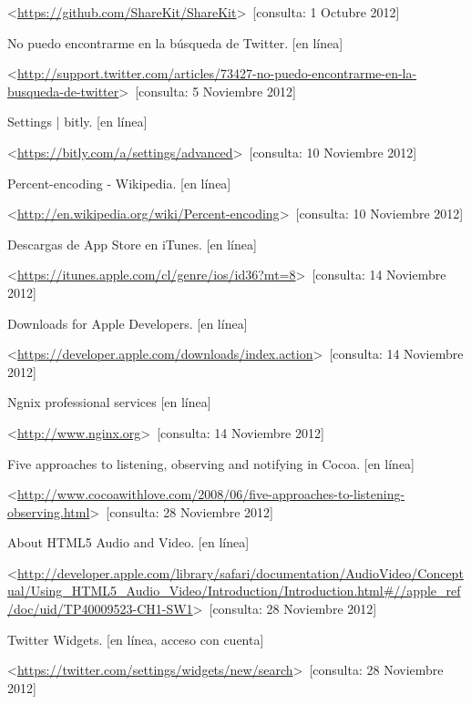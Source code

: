 \begin{thebibliography}{99}
\begin{sloppypar}
\textless \url{https://github.com/ShareKit/ShareKit}\textgreater \ [consulta: 1 Octubre 2012] 

%
No puedo encontrarme en la búsqueda de Twitter. [en línea]

\textless \url{http://support.twitter.com/articles/73427-no-puedo-encontrarme-en-la-busqueda-de-twitter}\textgreater \ [consulta: 5 Noviembre 2012] 

%
Settings | bitly. [en línea]\

\textless \url{https://bitly.com/a/settings/advanced}\textgreater \ [consulta: 10 Noviembre 2012] 

%
Percent-encoding - Wikipedia. [en línea]\

\textless \url{http://en.wikipedia.org/wiki/Percent-encoding}\textgreater \ [consulta: 10 Noviembre 2012] 

%
Descargas de App Store en iTunes. [en línea]\

\textless \url{https://itunes.apple.com/cl/genre/ios/id36?mt=8}\textgreater \ [consulta: 14 Noviembre 2012] 

%
Downloads for Apple Developers. [en línea]\

\textless \url{https://developer.apple.com/downloads/index.action}\textgreater \ [consulta: 14 Noviembre 2012]

%
Ngnix professional services [en línea]\

\textless \url{http://www.nginx.org}\textgreater \ [consulta: 14 Noviembre 2012]

%
Five approaches to listening, observing and notifying in Cocoa. [en línea]\

\textless \url{http://www.cocoawithlove.com/2008/06/five-approaches-to-listening-observing.html}\textgreater \ [consulta: 28 Noviembre 2012]

%
About HTML5 Audio and Video. [en línea]\

\textless \url{http://developer.apple.com/library/safari/documentation/AudioVideo/Conceptual/Using_HTML5_Audio_Video/Introduction/Introduction.html\#//apple_ref/doc/uid/TP40009523-CH1-SW1}\textgreater \ [consulta: 28 Noviembre 2012]

%
Twitter Widgets. [en línea, acceso con cuenta]\

\textless \url{https://twitter.com/settings/widgets/new/search}\textgreater \ [consulta: 28 Noviembre 2012]


\end{sloppypar}
\end{thebibliography}
